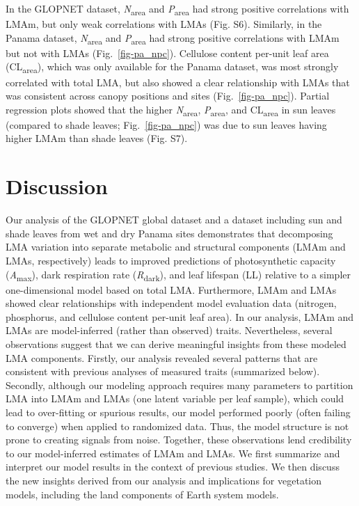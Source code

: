 \documentclass[
  12pt,
  letterpaper,
  DIV=11,
  numbers=noendperiod]{scrartcl}
\providecommand{\DIFaddend}{} %
\DeclareRobustCommand{\DIFaddend}{\DIFOaddend \let\includegraphics\DIFOincludegraphics} %
\begin{document}
\DIFaddend In the GLOPNET dataset, \emph{N}\textsubscript{area} and
\emph{P}\textsubscript{area} had strong positive correlations with LMAm,
but only weak correlations with LMAs (Fig. S6). Similarly, in the Panama
dataset, \emph{N}\textsubscript{area} and \emph{P}\textsubscript{area}
had strong positive correlations with LMAm but not with LMAs
(Fig.~\ref{fig-pa_npc}). Cellulose content per-unit leaf area
(CL\textsubscript{area}), which was only available for the Panama
dataset, was most strongly correlated with total LMA, but also showed a
clear relationship with LMAs that was consistent across canopy positions
and sites (Fig.~\ref{fig-pa_npc}). Partial regression plots showed that
the higher \emph{N}\textsubscript{area}, \emph{P}\textsubscript{area},
and CL\textsubscript{area} in sun leaves (compared to shade leaves;
Fig.~\ref{fig-pa_npc}) was due to sun leaves having higher LMAm than
shade leaves (Fig. S7).

\section{Discussion}\label{discussion}

Our analysis of the GLOPNET global dataset and a dataset including sun
and shade leaves from wet and dry Panama sites demonstrates that
decomposing LMA variation into separate metabolic and structural
components (LMAm and LMAs, respectively) leads to improved predictions
of photosynthetic capacity (\emph{A}\textsubscript{max}), dark
respiration rate (\emph{R}\textsubscript{dark}), and leaf lifespan (LL)
relative to a simpler one-dimensional model based on total LMA.
Furthermore, LMAm and LMAs showed clear relationships with independent
model evaluation data (nitrogen, phosphorus, and cellulose content
per-unit leaf area). In our analysis, LMAm and LMAs are model-inferred
(rather than observed) traits. Nevertheless, several observations
suggest that we can derive meaningful insights from these modeled LMA
components. Firstly, our analysis revealed several patterns that are
consistent with previous analyses of measured traits (summarized below).
Secondly, although our modeling approach requires many parameters to
partition LMA into LMAm and LMAs (one latent variable per leaf sample),
which could lead to over-fitting or spurious results, our model
performed poorly (often failing to converge) when applied to randomized
data. Thus, the model structure is not prone to creating signals from
noise. Together, these observations lend credibility to our
model-inferred estimates of LMAm and LMAs. We first summarize and
interpret our model results in the context of previous studies. We then
discuss the new insights derived from our analysis and implications for
vegetation models, including the land components of Earth system models.
\end{document}
